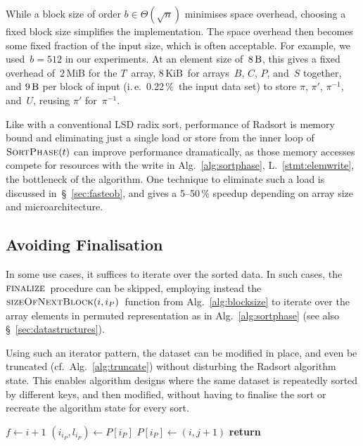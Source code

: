 \documentclass[nolineno,a4paper,UKenglish,cleveref, autoref, thm-restate]{socg-lipics-v2021}
\begin{document}
While a block size of order $b\in\Theta(\sqrt n)$ minimises space overhead,
choosing a fixed block size simplifies the implementation.
The space overhead then becomes some
fixed fraction of the input size, which is often acceptable.  For example,
we used~$b=512$ in our experiments.  At an element size of~$8\,\textrm B$,
this gives a fixed overhead of~$2\,\textrm{MiB}$ for the $T$~array,
$8\,\textrm{KiB}$~for arrays~$B$,
$C$, $P$, and~$S$ together, and $9\,\textrm B$ per block of input
(i.\,e.~0.22\,\%~the input data set) to store $\pi$, $\pi'$, $\pi^{-1}$,
and~$U$, reusing $\pi'$ for~$\pi^{-1}$.

Like with a conventional LSD radix sort, performance of Radsort is
memory bound and eliminating just a single load or store from the
inner loop of $\Call{SortPhase}{t}$ can improve performance dramatically,
as those memory accesses compete for resources with the write
in Alg.~\ref{alg:sortphase}, L.~\ref{stmt:elemwrite}, the bottleneck of the
algorithm.  One technique to eliminate such a load is discussed
in~\S~\ref{sec:fasteob}, and gives
a 5--50\,\% speedup depending on array size and microarchitecture.

\subsection{Avoiding Finalisation}
In some use cases, it suffices to iterate over the sorted data.  In such
cases, the $\Call{finalize}{}$~procedure can be skipped, employing instead
the $\Call{sizeOfNextBlock}{i,i_P}$~function from Alg.~\ref{alg:blocksize} to
iterate over the array elements in permuted representation as in
Alg.~\ref{alg:sortphase} (see also \S~\ref{sec:datastructures}).

Using such an iterator pattern, the dataset can be modified in place,
and even be truncated (cf.~Alg.~\ref{alg:truncate}) without
disturbing the Radsort algorithm state.  This enables algorithm designs
where the same dataset is repeatedly sorted by different keys, and then
modified, without having to finalise the sort or recreate the algorithm state
for every sort.

\begin{algorithm}
\caption{truncate the dataset such that logical block~$i$, element~$j$ is the final datum} \label{alg:truncate}
\begin{algorithmic}
\State$f\gets i+1$ 
 \State$(i_{i_P},l_{i_P})\gets P[i_P]$
  \State$P[i_P]\gets(i,j+1)$
  \State\textbf{return}
 \EndIf
\EndFor
\EndProcedure
\end{algorithmic}
\end{algorithm}
\end{document}

